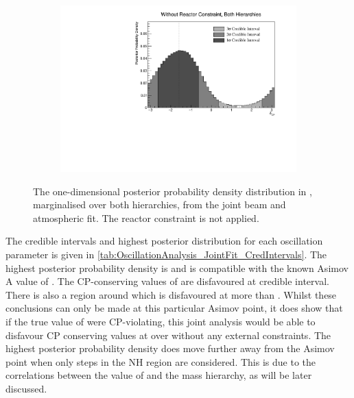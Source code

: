 \begin{figure}[h]
  \begin{subfigure}[t]{0.98\textwidth}
    \includegraphics[width=\textwidth, trim={0mm 0mm 0mm 0mm}, clip,page=1]{Figures/OA/JointFit/Contours_1D_dcp_BH_1_woRC_UnSmeared_CredibleInterval.pdf}
  \end{subfigure}
  \caption{The one-dimensional posterior probability density distribution in , marginalised over both hierarchies, from the joint beam and atmospheric fit. The reactor constraint is not applied.}
  \label{fig:OscillationAnalysis_JointFit_DCP}
\end{figure}

The credible intervals and highest posterior distribution for each oscillation parameter is given in \autoref{tab:OscillationAnalysis_JointFit_CredIntervals}. The highest posterior probability density is  and is compatible with the known Asimov A value of . The CP-conserving values of  are disfavoured at \quickmath{1\sigma} credible interval. There is also a region around  which is disfavoured at more than \quickmath{3\sigma}. Whilst these conclusions can only be made at this particular Asimov point, it does show that if the true value of  were CP-violating, this joint analysis would be able to disfavour CP conserving values at over \quickmath{1\sigma} without any external constraints. The highest posterior probability density does move further away from the Asimov point when only steps in the NH region are considered. This is due to the correlations between the value of  and the mass hierarchy, as will be later discussed.

